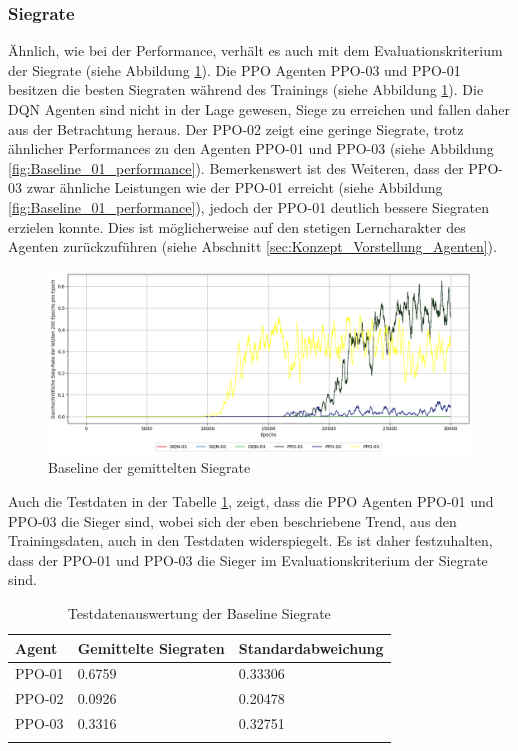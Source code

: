 \subsubsection{Siegrate} \label{sec:Evaluation_Siegrate}
Ähnlich, wie bei der Performance, verhält es auch mit dem Evaluationskriterium der Siegrate (siehe Abbildung \ref{fig:Baseline_winrate}).
Die PPO Agenten PPO-03 und PPO-01 besitzen die besten Siegraten während des Trainings (siehe Abbildung \ref{fig:Baseline_winrate}). 
Die DQN Agenten sind nicht in der Lage gewesen, Siege zu erreichen und fallen daher aus der Betrachtung heraus.
Der PPO-02 zeigt eine geringe Siegrate, trotz ähnlicher Performances zu den Agenten PPO-01 und PPO-03 (siehe Abbildung \ref{fig:Baseline_01_performance}).
Bemerkenswert ist des Weiteren, dass der PPO-03 zwar ähnliche Leistungen wie der PPO-01 erreicht (siehe Abbildung \ref{fig:Baseline_01_performance}), jedoch der PPO-01 deutlich bessere Siegraten erzielen konnte. Dies ist möglicherweise auf den stetigen Lerncharakter des Agenten zurückzuführen (siehe Abschnitt \ref{sec:Konzept_Vorstellung_Agenten}).
\begin{figure}[H]
	\centering
	\includegraphics[scale=0.4517]{Abbildungen/Evaluation/baseline-winrate.png}
	\caption[Baseline Vergleich Siegrate]{Baseline der gemittelten Siegrate}
	\label{fig:Baseline_winrate}
\end{figure}
Auch die Testdaten in der Tabelle \ref{tab:Evaluation_Testdaten_Winrate}, zeigt, dass die PPO Agenten PPO-01 und PPO-03 die Sieger sind, wobei sich der eben beschriebene Trend, aus den Trainingsdaten, auch in den Testdaten widerspiegelt. Es ist daher festzuhalten, dass der PPO-01 und PPO-03 die Sieger im Evaluationskriterium der Siegrate sind.

\begin{longtable}[h]{|p{3.7cm}|p{4.5cm}|p{4.5cm}|}
	\hline
	Agent & Gemittelte Siegraten & Standardabweichung \\
	\hline
	PPO-01 & 0.6759 & 0.33306 \\
	\hline
	PPO-02 & 0.0926 & 0.20478 \\
	\hline
	PPO-03 & 0.3316 & 0.32751 \\
	\hline
	\caption{Testdatenauswertung der Baseline Siegrate}
	\label{tab:Evaluation_Testdaten_Winrate} 
\end{longtable}
